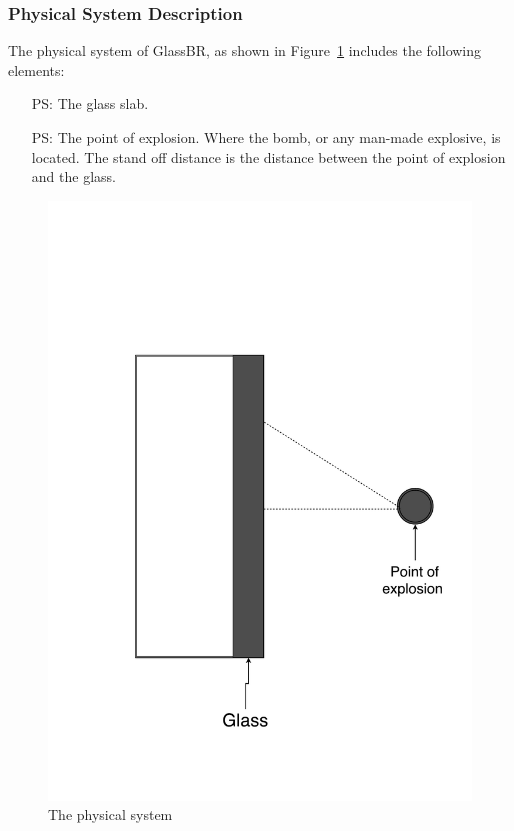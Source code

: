 \documentclass[12pt]{article}
\newcounter{physsysnum} %
\newcommand{\progname}{GlassBR}
\begin{document}
\subsubsection{Physical System Description}

The physical system of \progname, as shown in Figure~\ref{Fig_PhysSyst} includes
the following elements:
\begin{itemize}
	\item[PS\refstepcounter{physsysnum}\thephyssysnum:] The glass slab.
	\item[PS\refstepcounter{physsysnum}\thephyssysnum:] The point of
          explosion.  Where the bomb, or any man-made explosive,
	is located. The stand off distance is the distance between the point of
	explosion and the glass.
\end{itemize}
 
\begin{figure}[h!]
  \begin{center}
    \includegraphics[scale=0.25]{physicalsystimage.pdf}
    \caption{The physical system}
    \label{Fig_PhysSyst}
  \end{center}
\end{figure}
   
\end{document}
